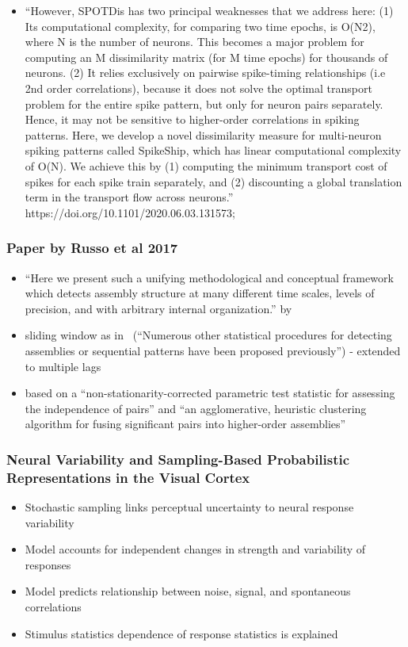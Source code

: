 \documentclass[brainsci, %
               review,submit,pdftex,moreauthors%
               ]{Definitions/mdpi}
\begin{document}
\begin{itemize}
 \item
  ``However, SPOTDis has two principal weaknesses that we address here: (1) Its computational complexity, for comparing two time epochs, is O(N2), where N is the number of neurons. This becomes a major problem for computing an M dissimilarity matrix (for M time epochs) for thousands of neurons. (2) It relies exclusively on pairwise spike-timing relationships (i.e 2nd order correlations), because it does not solve the optimal transport problem for the entire spike pattern, but only for neuron pairs separately. Hence, it may not be sensitive to higher-order correlations in spiking
  patterns.
  Here, we develop a novel dissimilarity measure for multi-neuron spiking patterns called SpikeShip, which has linear computational complexity of O(N). We achieve this by (1) computing the minimum transport cost of spikes for each spike train separately, and (2) discounting a global translation term in the transport flow across neurons.''
  https://doi.org/10.1101/2020.06.03.131573;
\end{itemize}

\subsubsection{Paper by Russo et al 2017~\citep{russo_cell_2017}}\label{paper-by-russo-et-al-2017-russo2017}
\begin{itemize}
 \item
  ``Here we present such a unifying methodological and conceptual framework which detects assembly structure at many different time scales, levels of precision, and with arbitrary internal organization.'' by~\citep{russo_cell_2017}
\item
  sliding window as in~\citep{grun_unitary_2002} (``Numerous other statistical procedures for detecting assemblies or sequential patterns have been proposed previously'') - extended to multiple lags~\citep{torre_synchronous_2016}
\item
  based on a ``non-stationarity-corrected parametric test statistic for assessing the independence of pairs'' and ``an agglomerative, heuristic clustering algorithm for fusing significant pairs into higher-order assemblies''
\end{itemize}

\subsubsection{Neural Variability and Sampling-Based Probabilistic Representations in the Visual Cortex~\citep{orban_neural_2016}}
\begin{itemize}
 \item
  Stochastic sampling links perceptual uncertainty to neural response variability
\item
  Model accounts for independent changes in strength and variability of responses
\item
  Model predicts relationship between noise, signal, and spontaneous correlations
\item
  Stimulus statistics dependence of response statistics is explained
\end{itemize}
\end{document}
